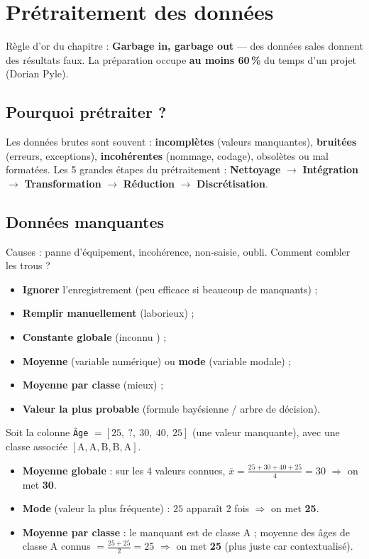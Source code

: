 \chapter{Prétraitement des données}

\begin{Astuce}
Règle d'or du chapitre : \textbf{\og Garbage in, garbage out \fg{}} — des données sales
donnent des résultats faux. La préparation occupe \textbf{au moins 60\,\%} du temps d'un
projet (Dorian Pyle).
\end{Astuce}

\section{Pourquoi prétraiter ?}
Les données brutes sont souvent : \textbf{incomplètes} (valeurs manquantes),
\textbf{bruitées} (erreurs, exceptions), \textbf{incohérentes} (nommage, codage),
obsolètes ou mal formatées. Les 5 grandes étapes du prétraitement :
\textbf{Nettoyage} $\rightarrow$ \textbf{Intégration} $\rightarrow$ \textbf{Transformation}
$\rightarrow$ \textbf{Réduction} $\rightarrow$ \textbf{Discrétisation}.

\section{Données manquantes}
Causes : panne d'équipement, incohérence, non-saisie, oubli. Comment combler les
\og trous \fg{} ?
\begin{itemize}[leftmargin=1.4em]
  \item \textbf{Ignorer} l'enregistrement (peu efficace si beaucoup de manquants) ;
  \item \textbf{Remplir manuellement} (laborieux) ;
  \item \textbf{Constante globale} (\og inconnu \fg{}) ;
  \item \textbf{Moyenne} (variable numérique) ou \textbf{mode} (variable modale) ;
  \item \textbf{Moyenne par classe} (mieux) ;
  \item \textbf{Valeur la plus probable} (formule bayésienne / arbre de décision).
\end{itemize}

\begin{Calcul}
Soit la colonne \texttt{Âge} $=[25,\ ?,\ 30,\ 40,\ 25]$ (une valeur manquante), avec une
classe associée $[\text{A},\text{A},\text{B},\text{B},\text{A}]$.
\begin{itemize}[nosep,leftmargin=1.4em]
  \item \textbf{Moyenne globale} : sur les 4 valeurs connues,
        $\overline{x}=\tfrac{25+30+40+25}{4}=30$ $\Rightarrow$ on met \textbf{30}.
  \item \textbf{Mode} (valeur la plus fréquente) : $25$ apparaît 2 fois $\Rightarrow$ on met \textbf{25}.
  \item \textbf{Moyenne par classe} : le manquant est de classe \og A \fg{} ; moyenne des âges
        de classe A connus $=\tfrac{25+25}{2}=25$ $\Rightarrow$ on met \textbf{25} (plus
        \og juste \fg{} car contextualisé).
\end{itemize}
\end{Calcul}

